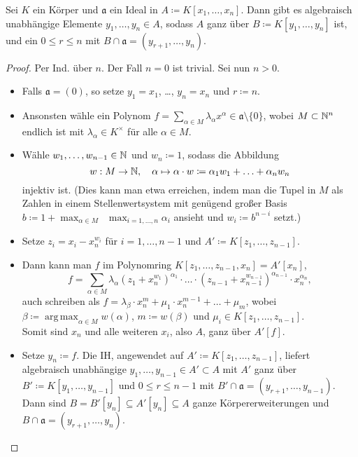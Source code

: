 \documentclass{cheat-sheet}
\DeclareMathOperator*{\argmax}{arg\,max}
\newcommand{\aaa}{\mathfrak{a}}
\begin{document}

\begin{prop}
  Sei $K$ ein Körper und $\aaa$ ein Ideal in $A \coloneqq K[x_1, \ldots, x_n]$.
  Dann gibt es algebraisch unabhängige Elemente $y_1, \ldots, y_n \in A$, sodass $A$ ganz über $B \coloneqq K[y_1, \ldots, y_n]$ ist, und ein $0 \leq r \leq n$ mit $B \cap \aaa = (y_{r+1}, \ldots, y_n)$.
\end{prop}

\begin{proof}
  Per Ind. über $n$. Der Fall $n=0$ ist trivial. Sei nun $n > 0$.
  \begin{itemize}
    \item Falls $\aaa = (0)$, so setze $y_1 = x_1$, \ldots, $y_n = x_n$ und $r \coloneqq n$.
    \item Ansonsten wähle ein Polynom $f = \sum_{\alpha \in M} \lambda_\alpha x^\alpha \in \aaa \setminus \{ 0 \}$, wobei $M \subset \mathbb{N}^n$ endlich ist mit $\lambda_\alpha \in K^{\times}$ für alle $\alpha \in M$.
    \item Wähle $w_1, \ldots, w_{n-1} \in \mathbb{N}$ und $w_n \coloneqq 1$, sodass die Abbildung
    \[
      w : M \to \mathbb{N}, \quad
      \alpha \mapsto \alpha \cdot w \coloneqq \alpha_1 w_1 + \ldots + \alpha_n w_n
    \]
    injektiv ist.
    (Dies kann man etwa erreichen, indem man die Tupel in $M$ als Zahlen in einem Stellenwertsystem mit genügend großer Basis $b \coloneqq 1 + \max_{\alpha \in M} \enspace \max_{i = 1, \ldots, n} \alpha_i$ ansieht und $w_i \coloneqq b^{n-i}$ setzt.)
    \item Setze $z_i = x_i - x_n^{w_i}$ für $i = 1, \ldots, n-1$ und $A' \coloneqq K[z_1, \ldots, z_{n-1}]$.
    \item Dann kann man $f$ im Polynomring $K[z_1, \ldots, z_{n-1}, x_n] = A'[x_n]$,
    \[
      f = \sum_{\alpha \in M} \lambda_\alpha (z_1 + x_n^{w_1})^{\alpha_1} \cdot \ldots \cdot (z_{n-1} + x_{n-1}^{w_{n-1}})^{\alpha_{n-1}} \cdot x_n^{\alpha_n},
    \]
     auch schreiben als $f = \lambda_\beta \cdot x_n^{m} + \mu_1 \cdot x_n^{m - 1} + \ldots + \mu_{m}$, wobei $\beta \coloneqq \argmax_{ \alpha \in M} w(\alpha)$, $m \coloneqq w(\beta)$ und $\mu_i \in K[z_1, \ldots, z_{n-1}]$. \\
     Somit sind $x_n$ und alle weiteren $x_i$, also $A$, ganz über $A'[f]$.
     \item Setze $y_n \coloneqq f$.
     Die IH, angewendet auf $A' \coloneqq K[z_1, \ldots, z_{n-1}]$, liefert algebraisch unabhängige $y_1, \ldots, y_{n-1} \in A' \subset A$ mit $A'$ ganz über $B' \coloneqq K[y_1, \ldots, y_{n-1}]$ und $0 \leq r \leq n-1$ mit $B' \cap \aaa = (y_{r+1}, \ldots, y_{n-1})$.
     Dann sind $B = B'[y_n] \subseteq A'[y_n] \subseteq A$ ganze Körpererweiterungen und $B \cap \aaa = (y_{r+1}, \ldots, y_n)$. \qedhere
  \end{itemize}
\end{proof}
\end{document}
